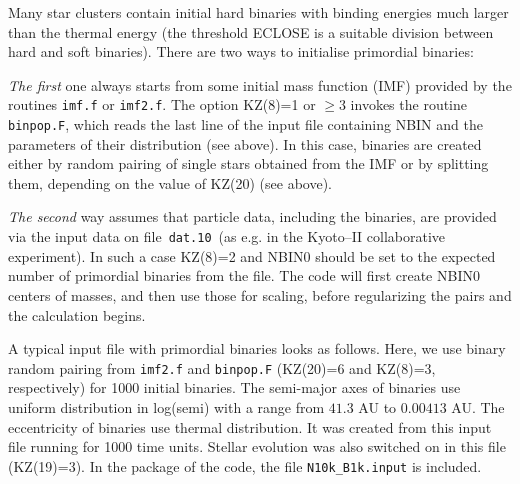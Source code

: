 Many star clusters contain initial hard binaries with binding
energies much larger than the thermal energy
(the threshold ECLOSE is a suitable division between hard and
soft binaries).
There are two ways to initialise primordial binaries:

{\it The first} one always starts from some initial mass function (IMF)
provided by the routines \texttt{imf.f} or \texttt{imf2.f}.
The option KZ(8)=1 or $\ge 3$ invokes the routine \texttt{binpop.F}, which reads the
last line of the input file containing NBIN and the parameters of
their distribution (see above).
In this case, binaries are created either by random pairing of
single stars obtained from the IMF or by splitting them, depending on
the value of KZ(20) (see above).

{\it The second} way assumes that particle data, including the binaries,
are provided via the input data on file $\,$\texttt{dat.10}$\,$ (as e.g.
in the Kyoto--II collaborative experiment).
In such a case KZ(8)=2 and NBIN0 should be set to the expected number of primordial binaries
from the file. The code will first create NBIN0 centers of masses, and then use those
for scaling, before regularizing the pairs and the calculation begins.

A typical input file with primordial binaries looks as follows.
Here, we use binary random pairing from \texttt{imf2.f} and \texttt{binpop.F}
(KZ(20)=6 and KZ(8)=3, respectively) for 1000 initial binaries.
The semi-major axes of binaries use uniform distribution in log(semi) with a range from $41.3$ AU to $0.00413$ AU.
The eccentricity of binaries use thermal distribution. 
It was created from this input file running for 1000 time units.
Stellar evolution was also switched on in this file (KZ(19)=3).
In the package of the code, the file \texttt{N10k\_B1k.input} is
included.
%
\begin{center}
\end{center}



